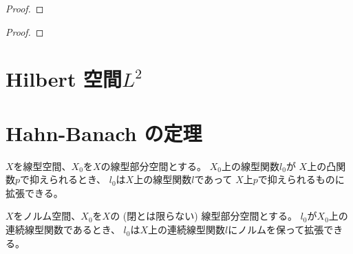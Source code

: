 \documentclass[report]{jlreq}
\begin{document}
\begin{proof}
    \TODO{}
\end{proof}

\begin{theorem}
    \TODO{}
\end{theorem}

\begin{proof}
    \TODO{}
\end{proof}

%
\section{Hilbert 空間$L^2$}

%
\section{Hahn-Banach の定理}

\begin{theorem}
    $X$を線型空間、$X_0$を$X$の線型部分空間とする。
    $X_0$上の線型関数$l_0$が
    $X$上の凸関数$p$で抑えられるとき、
    $l_0$は$X$上の線型関数$l$であって
    $X$上$p$で抑えられるものに拡張できる。
\end{theorem}

\begin{corollary}
    $X$をノルム空間、$X_0$を$X$の (閉とは限らない) 線型部分空間とする。
    $l_0$が$X_0$上の連続線型関数であるとき、
    $l_0$は$X$上の連続線型関数$l$にノルムを保って拡張できる。
\end{corollary}
\end{document}
